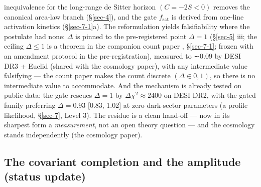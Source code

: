 \documentclass[aps,prd,preprint,nofootinbib,superscriptaddress]{revtex4-2}
\begin{document}
inequivalence for the long-range de Sitter horizon \((C = -2S < 0)\)
removes the canonical area-law branch (§\ref{sec-4}), and the gate
\(f_{\mathrm{sat}}\) is derived from one-line activation kinetics
(§\ref{sec-7-1}a). The reformulation yields falsifiability where the
postulate had none: \(\Delta\) is pinned to the pre-registered point
\(\Delta  = 1\) (§\ref{sec-5} iii; the ceiling \(\Delta  \leq  1\) is a
theorem in the companion count paper \cite{Pandev:2026count},
§\ref{sec-7-1}; frozen with an amendment protocol in the
pre-registration), measured to ∼0.09 by DESI DR3 + Euclid (shared with
the cosmology paper), with any intermediate value falsifying --- the
count paper makes the count discrete \((\Delta  \in  {0, 1})\), so there
is no intermediate value to accommodate. And the mechanism is already
tested on public data: the gate rescues \(\Delta  = 1\) by
\(\Delta \chi ^{2} \approx  2400\) on DESI DR2, with the gated family
preferring \(\Delta  = 0.93\) {[}0.83, 1.02{]} at zero dark-sector
parameters (a profile likelihood, §\ref{sec-7}, Level 3). The residue is
a clean hand-off --- now in its sharpest form a \emph{measurement}, not
an open theory question --- and the cosmology stands independently (the
cosmology paper).

\subsection{The covariant completion and the amplitude (status
update)}\label{sec-8-1}
\end{document}
